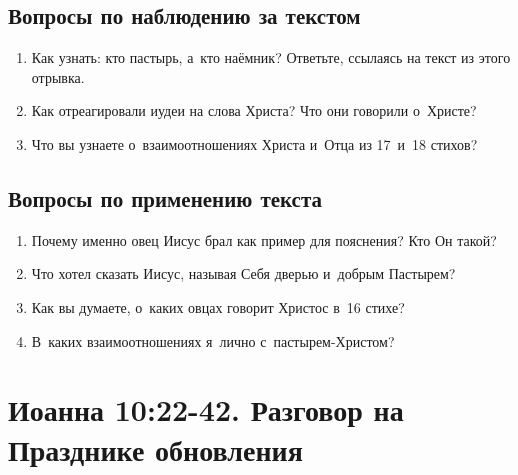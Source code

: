 \documentclass[a4paper,12pt]{article}
\begin{document}
\subsection*{Вопросы по наблюдению за текстом}
\begin{enumerate}
    \item Как узнать: кто пастырь, а~кто наёмник? Ответьте, ссылаясь на текст из этого отрывка. 
    
    \myline
    
    \myline
    \item Как отреагировали иудеи на слова Христа? Что они говорили о~Христе? 
    
    \myline
    
    \myline
    \item Что вы узнаете о~взаимоотношениях Христа и~Отца из 17~и~18 стихов? 
    
    \myline
    
    \myline
\end{enumerate}

\subsection*{Вопросы по применению текста} 
\begin{enumerate}
    \item Почему именно овец Иисус брал как пример для пояснения? Кто Он такой? 
    
    \myline
    
    \myline
    \item Что хотел сказать Иисус, называя Себя дверью и~добрым Пастырем? 
    
    \myline
    
    \myline
    \item Как вы думаете, о~каких овцах говорит Христос в~16 стихе? 
    
    \myline
    
    \myline
    \item В~каких взаимоотношениях я~лично с~пастырем-Христом? 
    
    \myline
    
    \myline
\end{enumerate}


\section{Иоанна 10:22-42. Разговор на Празднике обновления}
\end{document}
